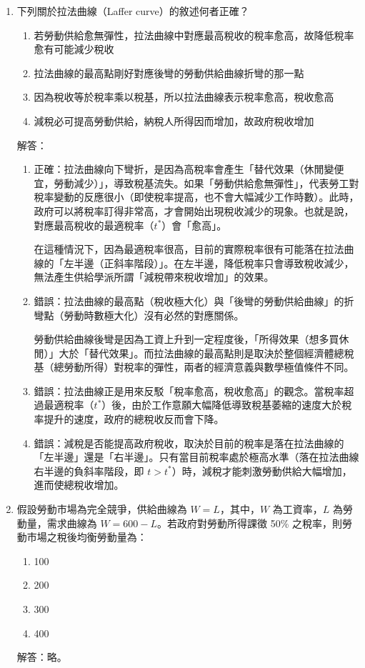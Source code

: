 \documentclass[12pt, a4paper]{article}
\begin{document}
\begin{enumerate}
    \item 下列關於拉法曲線（Laffer curve）的敘述何者正確？
    \begin{enumerate}[label=\Alph*.]
        \item 若勞動供給愈無彈性，拉法曲線中對應最高稅收的稅率愈高，故降低稅率愈有可能減少稅收
        \item 拉法曲線的最高點剛好對應後彎的勞動供給曲線折彎的那一點
        \item 因為稅收等於稅率乘以稅基，所以拉法曲線表示稅率愈高，稅收愈高
        \item 減稅必可提高勞動供給，納稅人所得因而增加，故政府稅收增加
    \end{enumerate}
    解答：
    \begin{enumerate}[label=\Alph*.]
        \item 正確：拉法曲線向下彎折，是因為高稅率會產生「替代效果（休閒變便宜，勞動減少）」，導致稅基流失。如果「勞動供給愈無彈性」，代表勞工對稅率變動的反應很小（即使稅率提高，也不會大幅減少工作時數）。此時，政府可以將稅率訂得非常高，才會開始出現稅收減少的現象。也就是說，對應最高稅收的最適稅率（$t^*$）會「愈高」。

        在這種情況下，因為最適稅率很高，目前的實際稅率很有可能落在拉法曲線的「左半邊（正斜率階段）」。在左半邊，降低稅率只會導致稅收減少，無法產生供給學派所謂「減稅帶來稅收增加」的效果。
        \item 錯誤：拉法曲線的最高點（稅收極大化）與「後彎的勞動供給曲線」的折彎點（勞動時數極大化）沒有必然的對應關係。

        勞動供給曲線後彎是因為工資上升到一定程度後，「所得效果（想多買休閒）」大於「替代效果」。而拉法曲線的最高點則是取決於整個經濟體總稅基（總勞動所得）對稅率的彈性，兩者的經濟意義與數學極值條件不同。
        \item 錯誤：拉法曲線正是用來反駁「稅率愈高，稅收愈高」的觀念。當稅率超過最適稅率（$t^*$）後，由於工作意願大幅降低導致稅基萎縮的速度大於稅率提升的速度，政府的總稅收反而會下降。
        \item 錯誤：減稅是否能提高政府稅收，取決於目前的稅率是落在拉法曲線的「左半邊」還是「右半邊」。只有當目前稅率處於極高水準（落在拉法曲線右半邊的負斜率階段，即 $t > t^*$）時，減稅才能刺激勞動供給大幅增加，進而使總稅收增加。
    \end{enumerate}

    \item 假設勞動市場為完全競爭，供給曲線為 \(W = L\)，其中，\(W\) 為工資率，\(L\) 為勞動量，需求曲線為 \(W = 600 - L\)。若政府對勞動所得課徵 50\% 之稅率，則勞動市場之稅後均衡勞動量為：
    \begin{enumerate}[label=\Alph*.]
        \item 100
        \item 200
        \item 300
        \item 400
    \end{enumerate}
    解答：略。


\end{enumerate}
\end{document}
